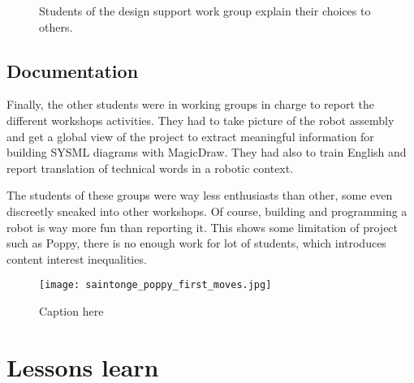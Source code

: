 \begin{figure}[]
\centering
    \hfil
    \hfil
    \caption{Students of the design support work group explain their choices to others.}
    \label{fig:saintonge_support}
\end{figure}


\subsection{Documentation } %

Finally, the other students were in working groups in charge to report the different workshops activities. They had to take picture of the robot assembly and get a global view of the project to extract meaningful information for building SYSML diagrams with MagicDraw. They had also to train English and report translation of technical words in a robotic context.

The students of these groups were way less enthusiasts than other, some even discreetly sneaked into other workshops. Of course, building and programming a robot is way more fun than reporting it. This shows some limitation of project such as Poppy, there is no enough work for lot of students, which introduces content interest inequalities.

\begin{figure}[]
    \begin{center}
        \texttt{[image: saintonge\_poppy\_first\_moves.jpg]}
    \end{center}
    \caption{Caption here}
    \label{fig:saintonge_result}
\end{figure}

\begin{figure}[]
\centering
    \hfil
    \caption{}
    \label{fig:saintonge_demonstration}
\end{figure}



\section{Lessons learn} %

